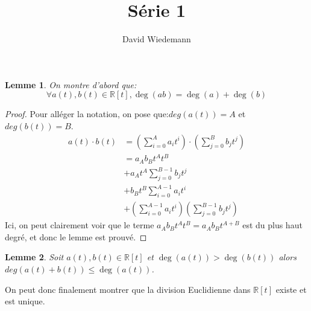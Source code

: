 \documentclass[11pt, a4paper, twoside]{article}
\newtheorem{lemma}{Lemme}
\begin{document}
\title{Série 1}
\author{David Wiedemann}
\maketitle
\begin{lemma}\label{degres}
On montre d'abord que:
\[ 
	\forall a(t) , b(t) \in \mathbb{R}[t], \deg (ab) = \deg(a) + \deg(b)
\]

\end{lemma}
\begin{proof}
Pour alléger la notation, on pose que:$deg(a(t)) = A$ et $deg(b(t)) = B$.\\
\begin{align*}
	a(t) \cdot b(t) &= \left( \sum_{i=0}^{A}a_i t^{i}\right) \cdot \left( \sum_{j=0}^{B}b_j t^{j}\right)\\
			&= a_A b_B t^{A} t^{B}\\
			&+ a_A t^{A} \sum_{j=0}^{B-1} b_j t^{j}\\
			&+ b_B t^{B} \sum_{i=0}^{A-1}a_i t^{i}\\
			&+ \left( \sum_{i=0}^{A-1} a_i t^{i}\right) \left( \sum_{j=0}^{B-1}b_j t^{j}\right)
\end{align*}
Ici, on peut clairement voir que le terme $a_A b_B t^{A} t^{B} =a_A b_B t^{A+B} $ est du plus haut degré, et donc le lemme est prouvé.
\end{proof}
\begin{lemma}\label{somme}
	Soit $a(t), b(t) \in \mathbb{R}[t]$ et $\deg(a(t))>\deg(b(t))$ alors $deg(a(t) + b(t)) \leq \deg (a(t))$.
\end{lemma}
On peut donc finalement montrer que la division Euclidienne dans $\mathbb{R}[t]$ existe et est unique.
\end{document}
